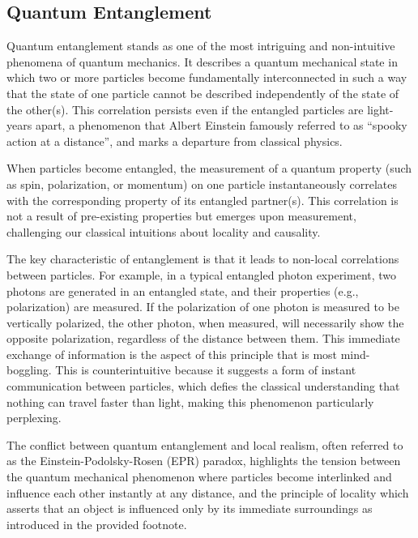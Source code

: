 \documentclass{report}
\begin{document}
\subsection{Quantum Entanglement}

Quantum entanglement stands as one of the most intriguing and non-intuitive phenomena of quantum mechanics. It describes a quantum mechanical state in which two or more particles become fundamentally interconnected in such a way that the state of one particle cannot be described independently of the state of the other(s). This correlation persists even if the entangled particles are light-years apart, a phenomenon that Albert Einstein famously referred to as “spooky action at a distance”, and marks a departure from classical physics.

When particles become entangled, the measurement of a quantum property (such as spin, polarization, or momentum) on one particle instantaneously correlates with the corresponding property of its entangled partner(s). This correlation is not a result of pre-existing properties but emerges upon measurement, challenging our classical intuitions about locality and causality.

The key characteristic of entanglement is that it leads to non-local correlations between particles. For example, in a typical entangled photon experiment, two photons are generated in an entangled state, and their properties (e.g., polarization) are measured. If the polarization of one photon is measured to be vertically polarized, the other photon, when measured, will necessarily show the opposite polarization, regardless of the distance between them.
This immediate exchange of information is the aspect of this principle that is most mind-boggling. This is counterintuitive because it suggests a form of instant communication between particles, which defies the classical understanding that nothing can travel faster than light, making this phenomenon particularly perplexing.

The conflict between quantum entanglement and local realism, often referred to as the Einstein-Podolsky-Rosen (EPR) paradox, highlights the tension between the quantum mechanical phenomenon where particles become interlinked and influence each other instantly at any distance, and the principle of locality which asserts that an object is influenced only by its immediate surroundings as introduced in the provided footnote.

\cite{scientificamericanQuantumEntanglement}
\cite{veritasiumentanglemet}
\cite{caltechWhatEntanglement}
\end{document}

